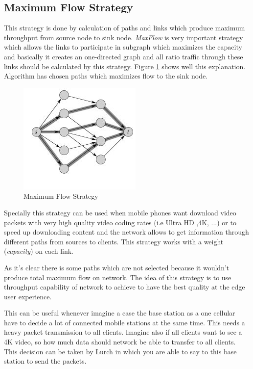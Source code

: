 \subsection{Maximum Flow Strategy}
This strategy is done by calculation of paths and links which produce maximum throughput from source node to sink node. \textit{MaxFlow} is very important strategy which allows the links to participate in subgraph which maximizes the capacity and basically it creates an one-directed graph and all ratio traffic through these links should be calculated by this strategy. Figure \ref{max} shows well this explanation. Algorithm has chosen paths which maximizes flow to the sink node.

\begin{figure}[H]

\begin{center}

\includegraphics[scale = 0.8]{Pictures/max.jpg}

\caption{Maximum Flow Strategy} \label{max} 

\end{center}

\end{figure}


 
Specially this strategy can be used when mobile phones want download video packets with very high quality video coding rates (i.e Ultra HD ,4K, ...) or to speed up downloading content and the network allows to get information through different paths from sources to clients. This strategy works with a weight (\textit{capacity}) on each link.

As it's clear there is some paths which are not selected because it wouldn't produce total maximum flow on network.  The idea of this strategy is to use throughput capability of network to achieve to have the best quality at the edge user experience. 

This can be useful whenever imagine a case the base station as a one cellular have to decide a lot of connected mobile stations at the same time. This needs a heavy packet transmission to all clients. Imagine also if all clients want to see a 4K video, so how much data should network be able to transfer to all clients. This decision can be taken by Lurch in which you are able to say to this base station to send the packets.

 





